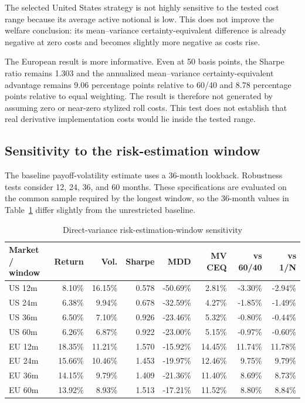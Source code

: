 The selected United States strategy is not highly sensitive to the tested cost range because its average active notional is low. This does not improve the welfare conclusion: its mean--variance certainty-equivalent difference is already negative at zero costs and becomes slightly more negative as costs rise.

The European result is more informative. Even at 50 basis points, the Sharpe ratio remains 1.303 and the annualized mean--variance certainty-equivalent advantage remains 9.06 percentage points relative to 60/40 and 8.78 percentage points relative to equal weighting. The result is therefore not generated by assuming zero or near-zero stylized roll costs. This test does not establish that real derivative implementation costs would lie inside the tested range.

\subsection{Sensitivity to the risk-estimation window}

The baseline payoff-volatility estimate uses a 36-month lookback. Robustness tests consider 12, 24, 36, and 60 months. These specifications are evaluated on the common sample required by the longest window, so the 36-month values in Table~\ref{tab:lookback_robustness} differ slightly from the unrestricted baseline.

\begin{table}[htbp]
\centering
\scriptsize
\caption{Direct-variance risk-estimation-window sensitivity}
\label{tab:lookback_robustness}
\begin{tabularx}{\textwidth}{Xrrrrrrr}
\toprule
Market / window
& Return
& Vol.
& Sharpe
& MDD
& MV CEQ
& vs 60/40
& vs 1/N \\
\midrule
US 12m
& 8.10\%
& 16.15\%
& 0.578
& -50.69\%
& 2.81\%
& -3.30\%
& -2.94\% \\
US 24m
& 6.38\%
& 9.94\%
& 0.678
& -32.59\%
& 4.27\%
& -1.85\%
& -1.49\% \\
US 36m
& 6.50\%
& 7.10\%
& 0.926
& -23.46\%
& 5.32\%
& -0.80\%
& -0.44\% \\
US 60m
& 6.26\%
& 6.87\%
& 0.922
& -23.00\%
& 5.15\%
& -0.97\%
& -0.60\% \\
EU 12m
& 18.35\%
& 11.21\%
& 1.570
& -15.92\%
& 14.45\%
& 11.74\%
& 11.78\% \\
EU 24m
& 15.66\%
& 10.46\%
& 1.453
& -19.97\%
& 12.46\%
& 9.75\%
& 9.79\% \\
EU 36m
& 14.15\%
& 9.79\%
& 1.409
& -21.36\%
& 11.40\%
& 8.69\%
& 8.73\% \\
EU 60m
& 13.92\%
& 8.93\%
& 1.513
& -17.21\%
& 11.52\%
& 8.80\%
& 8.84\% \\
\bottomrule
\end{tabularx}
\end{table}


